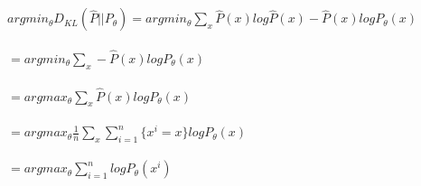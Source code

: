 \newcommand\tab[1][1cm]{\hspace*{#1}}
\begin{answer}
\\ \\
$argmin_\theta D_{KL}(\hat{P}||P_\theta) = argmin_\theta \sum_x \hat{P}(x)log\hat{P}(x) - \hat{P}(x)logP_\theta(x)$ \\ \\
\tab[3cm]$ = argmin_\theta \sum_x - \hat{P}(x)logP_\theta(x)$ \\ \\
\tab[3cm]$ = argmax_\theta \sum_x \hat{P}(x)logP_\theta(x)$ \\ \\
\tab[3cm]$ = argmax_\theta \frac{1}{n} \sum_x  \sum_{i=1}^n  \{x^i = x\} logP_\theta(x)$ \\ \\
\tab[3cm]$ = argmax_\theta  \sum_{i=1}^n  logP_\theta(x^i)$ \\ \\
\end{answer}
